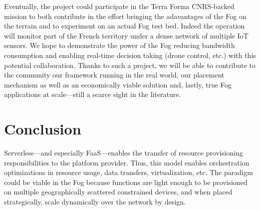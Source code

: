 Eventually, the project could participate in the Terra Forma \cite{longuevergne_terra_2022} CNRS-backed mission to both contribute in the effort bringing the adavantages of the Fog on the terrain and to experiment on an actual Fog test bed. Indeed the operation will monitor part of the French territory under a dense network of multiple \gls{IoT} sensors. We hope to demonstrate the power of the Fog reducing bandwidth consumption and enabling real-time decision taking (drone control, etc.) with this potential collaboration. Thanks to such a project, we will be able to contribute to the community our framework running in the real world, our placement mechanism as well as an economically viable solution and, lastly, true Fog applications at scale—still a scarce sight in the literature.

\section{Conclusion}

Serverless—and especially \gls{FaaS}—enables the transfer of resource provisioning responsibilities to the platform provider. Thus, this model enables orchestration optimizations in resource usage, data transfers, virtualization, etc. The paradigm could be viable in the Fog because functions are light enough to be provisioned on multiple geographically scattered constrained devices, and when placed strategically, scale dynamically over the network by design.

